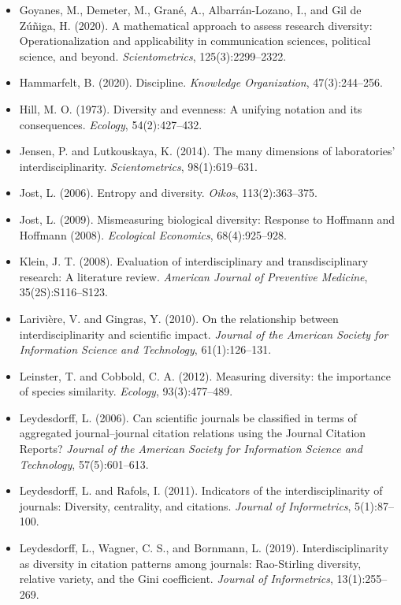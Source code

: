 \documentclass[
]{article}
\begin{document}
\begin{itemize}
\item
  Goyanes, M., Demeter, M., Grané, A., Albarrán-Lozano, I., and Gil de
  Zúñiga, H. (2020). A mathematical approach to assess research
  diversity: Operationalization and applicability in communication
  sciences, political science, and beyond. \emph{Scientometrics},
  125(3):2299--2322.
\item
  Hammarfelt, B. (2020). Discipline. \emph{Knowledge Organization},
  47(3):244--256.
\item
  Hill, M. O. (1973). Diversity and evenness: A unifying notation and
  its consequences. \emph{Ecology}, 54(2):427--432.
\item
  Jensen, P. and Lutkouskaya, K. (2014). The many dimensions of
  laboratories' interdisciplinarity. \emph{Scientometrics},
  98(1):619--631.
\item
  Jost, L. (2006). Entropy and diversity. \emph{Oikos}, 113(2):363--375.
\item
  Jost, L. (2009). Mismeasuring biological diversity: Response to
  Hoffmann and Hoffmann (2008). \emph{Ecological Economics},
  68(4):925--928.
\item
  Klein, J. T. (2008). Evaluation of interdisciplinary and
  transdisciplinary research: A literature review. \emph{American
  Journal of Preventive Medicine}, 35(2S):S116--S123.
\item
  Larivière, V. and Gingras, Y. (2010). On the relationship between
  interdisciplinarity and scientific impact. \emph{Journal of the
  American Society for Information Science and Technology},
  61(1):126--131.
\item
  Leinster, T. and Cobbold, C. A. (2012). Measuring diversity: the
  importance of species similarity. \emph{Ecology}, 93(3):477--489.
\item
  Leydesdorff, L. (2006). Can scientific journals be classified in terms
  of aggregated journal--journal citation relations using the Journal
  Citation Reports? \emph{Journal of the American Society for
  Information Science and Technology}, 57(5):601--613.
\item
  Leydesdorff, L. and Rafols, I. (2011). Indicators of the
  interdisciplinarity of journals: Diversity, centrality, and citations.
  \emph{Journal of Informetrics}, 5(1):87--100.
\item
  Leydesdorff, L., Wagner, C. S., and Bornmann, L. (2019).
  Interdisciplinarity as diversity in citation patterns among journals:
  Rao-Stirling diversity, relative variety, and the Gini coefficient.
  \emph{Journal of Informetrics}, 13(1):255--269.

\end{itemize}
\end{document}
